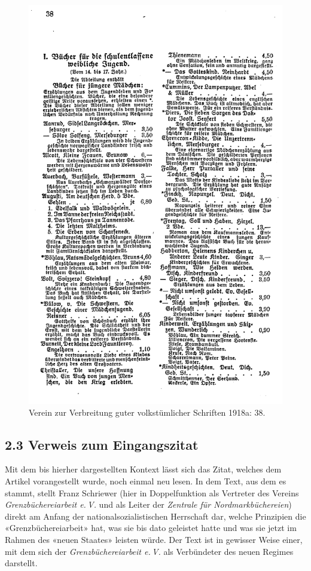 \documentclass[a4paper,
fontsize=11pt,
oneside,
numbers=noperiodatend,
parskip=half-,
bibliography=totoc,
final
]{scrartcl}
\begin{document}
\begin{figure}
\centering
\includegraphics{img/buecherliste_arbeiterinnen_2.jpg}
\caption{Verein zur Verbreitung guter volkstümlicher Schriften 1918a:
38.}
\end{figure}

\hypertarget{verweis-zum-eingangszitat}{%
\subsection{2.3 Verweis zum
Eingangszitat}\label{verweis-zum-eingangszitat}}

Mit dem bis hierher dargestellten Kontext lässt sich das Zitat, welches
dem Artikel vorangestellt wurde, noch einmal neu lesen. In dem Text, aus
dem es stammt, stellt Franz Schriewer (hier in Doppelfunktion als
Vertreter des Vereins \emph{Grenzbüchereiarbeit e.\,V.} und als Leiter der
\emph{Zentrale für Nordmarkbüchereien}) direkt am Anfang der
nationalsozialistischen Herrschaft dar, welche Prinzipien die
«Grenzbüchereiarbeit» hat, was sie bis dato geleistet hatte und was sie
jetzt im Rahmen des «neuen Staates» leisten würde. Der Text ist in
gewisser Weise einer, mit dem sich der \emph{Grenzbüchereiarbeit e.\,V.}
als Verbündeter des neuen Regimes darstellt.
\end{document}
